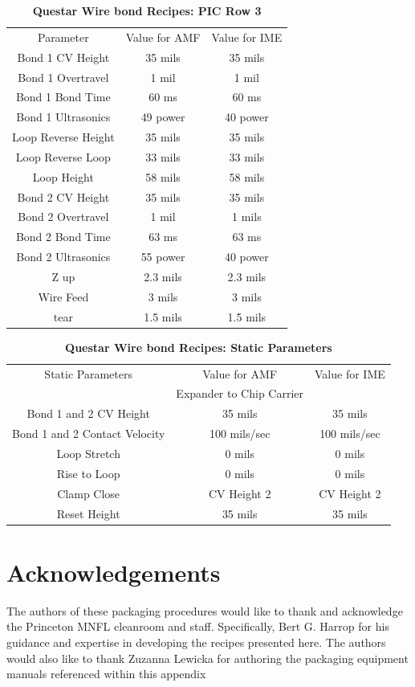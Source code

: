 \begin{table}[!ht]
\caption[Questar Wire bond Recipes: PIC Row 3]{\textbf{Questar Wire bond Recipes: PIC Row 3}}
\centering
\begin{tabular}{|c||c||c|}
\hline
Parameter & Value for AMF & Value for IME \\ \hhline{|=|=|=|}
Bond 1 CV Height & 35 mils & 35 mils \\ \hline
Bond 1 Overtravel &  1 mil &  1 mil \\ \hline
Bond 1 Bond Time & 60 ms & 60 ms\\ \hline
Bond 1 Ultrasonics &  49 power & 40 power \\ \hline
Loop Reverse Height & 35 mils & 35 mils \\ \hline 
Loop Reverse Loop & 33 mils & 33 mils \\ \hline
Loop Height & 58 mils & 58 mils \\ \hline
Bond 2 CV Height &  35 mils  & 35 mils \\ \hline
Bond 2 Overtravel &  1 mil &  1 mils \\ \hline
Bond 2 Bond Time &  63 ms &  63 ms \\ \hline
Bond 2 Ultrasonics &  55 power &  40 power \\ \hline
Z up &  2.3 mils & 2.3 mils \\ \hline
Wire Feed & 3 mils & 3 mils \\ \hline
tear & 1.5  mils & 1.5 mils \\ \hline
\end{tabular}
\end{table}

\begin{table}[!ht]
\caption[Questar Wire bond Recipes: Static Parameters]{\textbf{Questar Wire bond Recipes: Static Parameters}}
\centering
\begin{tabular}{|c||c||c|}
\hline
Static Parameters & Value for AMF & Value for IME \\ \hhline{|=|=|=|}
& Expander to Chip Carrier & \\ \hline
Bond 1 and 2 CV Height &  35 mils &  35 mils \\ \hline
Bond 1 and 2 Contact Velocity  & 100 mils/sec  & 100 mils/sec \\ \hline
Loop Stretch & 0 mils  & 0 mils \\ \hline
Rise to Loop & 0 mils  &  0 mils \\ \hline
Clamp Close & CV Height 2  & CV Height 2 \\ \hline
Reset Height & 35 mils & 35 mils \\ \hline
\end{tabular}
\end{table}

\section{Acknowledgements}
\qquad The authors of these packaging procedures would like to thank and acknowledge the Princeton MNFL cleanroom and staff. Specifically, Bert G. Harrop for his guidance and expertise in developing the recipes presented here. The authors would also like to thank Zuzanna Lewicka for authoring the packaging equipment manuals referenced within this appendix
